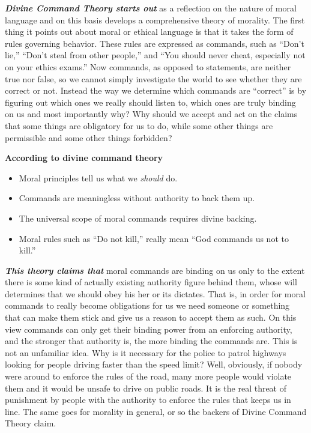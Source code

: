 \documentclass[
  12pt, openany]{book}
\makeatletter
\providecommand{\tightlist}{%
  \setlength{\itemsep}{0pt}\setlength{\parskip}{0pt}}
\newenvironment{kframe}{%
\medskip{}
\setlength{\fboxsep}{.8em}
 \def\at@end@of@kframe{}%
 \ifinner\ifhmode%
  \def\at@end@of@kframe{\end{minipage}}%
  \begin{minipage}{\columnwidth}%
 \fi\fi%
 \def\FrameCommand##1{\hskip\@totalleftmargin \hskip-\fboxsep
 \colorbox{shadecolor}{##1}\hskip-\fboxsep
     \hskip-\linewidth \hskip-\@totalleftmargin \hskip\columnwidth}%
 \MakeFramed {\advance\hsize-\width
   \@totalleftmargin\z@ \linewidth\hsize
   \@setminipage}}%
 {\par\unskip\endMakeFramed%
 \at@end@of@kframe}
\newenvironment{rmdblock}[1]
  {
  \begin{itemize}
  \renewcommand{\labelitemi}{
    \raisebox{-.7\height}[0pt][0pt]{
      {\setkeys{Gin}{width=3em,keepaspectratio}\texttt{[image: img/\#1]}}
    }
  }
  \setlength{\fboxsep}{1em}
  \begin{kframe}
  \item
  }
  {
  \end{kframe}
  \end{itemize}
  }
\newenvironment{note}
  {\begin{rmdblock}{note}}
  {\end{rmdblock}}
\makeatother
\begin{document}
\textbf{\emph{Divine Command Theory starts out}} as a reflection on the nature of moral language and on this basis develops a comprehensive theory of morality. The first thing it points out about moral or ethical language is that it takes the form of rules governing behavior. These rules are expressed as commands, such as ``Don't lie,'' ``Don't steal from other people,'' and ``You should never cheat, especially not on your ethics exams.'' Now commands, as opposed to statements, are neither true nor false, so we cannot simply investigate the world to see whether they are correct or not. Instead the way we determine which commands are ``correct'' is by figuring out which ones we really should listen to, which ones are truly binding on us and most importantly why? Why should we accept and act on the claims that some things are obligatory for us to do, while some other things are permissible and some other things forbidden?

\begin{note}

\textbf{According to divine command theory}

\begin{itemize}
\tightlist
\item
  Moral principles tell us what we \emph{should} do.
\item
  Commands are meaningless without authority to back them up.
\item
  The universal scope of moral commands requires divine backing.
\item
  Moral rules such as ``Do not kill,'' really mean ``God commands us not to kill.''
\end{itemize}

\end{note}

\textbf{\emph{This theory claims that}} moral commands are binding on us only to the extent there is some kind of actually existing authority figure behind them, whose will determines that we should obey his her or its dictates. That is, in order for moral commands to really become obligations for us we need someone or something that can make them stick and give us a reason to accept them as such. On this view commands can only get their binding power from an enforcing authority, and the stronger that authority is, the more binding the commands are. This is not an unfamiliar idea. Why is it necessary for the police to patrol highways looking for people driving faster than the speed limit? Well, obviously, if nobody were around to enforce the rules of the road, many more people would violate them and it would be unsafe to drive on public roads. It is the real threat of punishment by people with the authority to enforce the rules that keeps us in line. The same goes for morality in general, or so the backers of Divine Command Theory claim.
\end{document}
